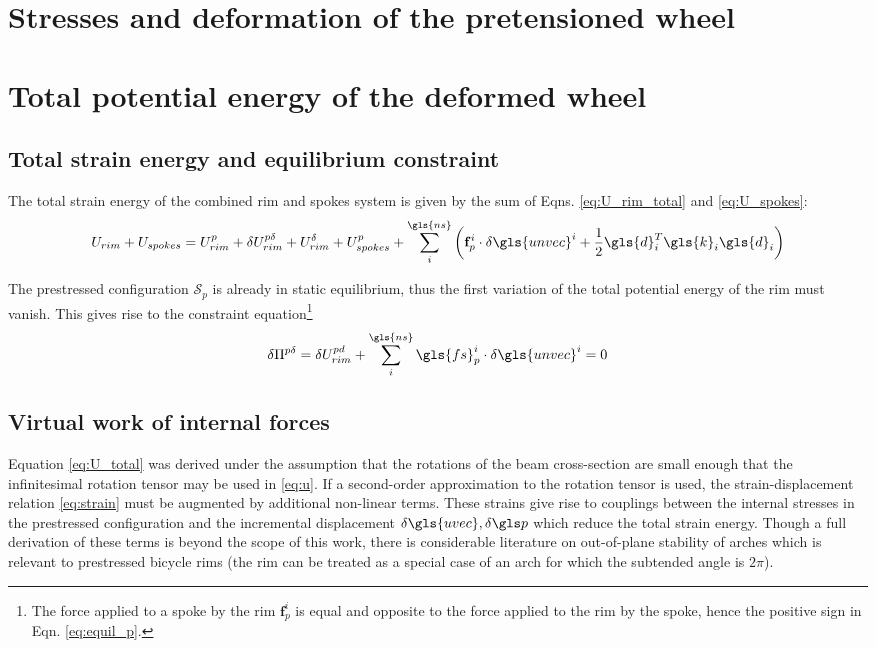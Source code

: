 \documentclass[\rootdir/thesis.tex]{subfiles}
\begin{document}
\section{Stresses and deformation of the pretensioned wheel}
\label{sec:radial_bulging}



\section{Total potential energy of the deformed wheel}

\subsection{Total strain energy and equilibrium constraint}

The total strain energy of the combined rim and spokes system is given by the sum of Eqns. \eqref{eq:U_rim_total} and \eqref{eq:U_spokes}:
\begin{equation}
\label{eq:U_total}
U_{rim} + U_{spokes} = U_{rim}^p + \delta U_{rim}^{p\delta} + U_{rim}^{\delta} + 
	U_{spokes}^p + \sum_i^{\gls{ns}} \left(\mathbf{f}_p^i \cdot \delta\gls{unvec}^i +
    \frac{1}{2}\gls{d}_i^T \gls{k}_i \gls{d}_i\right)
\end{equation}

The prestressed configuration $\mathcal{S}_p$ is already in static equilibrium, thus the first variation of the total potential energy of the rim must vanish. This gives rise to the constraint equation\footnote{The force applied to a spoke by the rim $\mathbf{f}_p^i$ is equal and opposite to the force applied to the rim by the spoke, hence the positive sign in Eqn. \eqref{eq:equil_p}.}
\begin{equation}
\label{eq:equil_p}
\delta\Pi^{p\delta} = \delta U_{rim}^{pd} + \sum_i^{\gls{ns}} \gls{fs}_p^i \cdot \delta\gls{unvec}^i = 0
\end{equation}


\subsection{Virtual work of internal forces}

Equation \eqref{eq:U_total} was derived under the assumption that the rotations of the beam cross-section are small enough that the infinitesimal rotation tensor may be used in \eqref{eq:u}. If a second-order approximation to the rotation tensor is used, the strain-displacement relation \eqref{eq:strain} must be augmented by additional non-linear terms. These strains give rise to couplings between the internal stresses in the prestressed configuration and the incremental displacement $\delta\gls{uvec}, \delta\p$ which reduce the total strain energy. Though a full derivation of these terms is beyond the scope of this work, there is considerable literature on out-of-plane stability of arches which is relevant to prestressed bicycle rims (the rim can be treated as a special case of an arch for which the subtended angle is $2\pi$).
\end{document}
